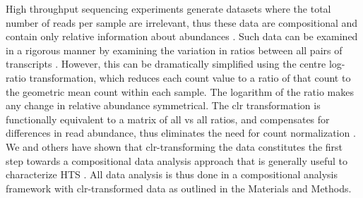 \documentclass[10pt,letterpaper]{article}
\begin{document}
High throughput sequencing experiments generate datasets where the total number of reads per sample are irrelevant, thus these data are compositional and contain only relative information about abundances \cite{fernandes:2014}. Such data can be examined in a rigorous manner by examining the variation in ratios between all pairs of transcripts \cite{Aitchison:1986, pawlowsky2015modeling,pawlowsky2011compositional}. However, this can be dramatically simplified using the centre log-ratio transformation, which reduces each count value to a ratio of that count to the geometric mean count within each sample. The logarithm of the ratio makes any change in relative abundance symmetrical. The clr transformation is functionally equivalent to a matrix of all vs all ratios, and  compensates for differences in read abundance, thus eliminates the need for count normalization \cite{Lovell:2015}.  We and others have shown that clr-transforming the data constitutes the first step towards a compositional data analysis approach that is generally useful  to characterize HTS \cite{Friedman:2012, fernandes:2013,fernandes:2014,Lovell:2015}. All data analysis is thus done in a compositional analysis framework with clr-transformed data as outlined in the Materials and Methods. 

\end{document}
